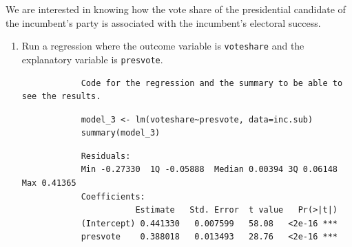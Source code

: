 \documentclass[12pt,letterpaper]{article}
\begin{document}
\noindent We are interested in knowing how the vote share of the presidential candidate of the incumbent's party is associated with the incumbent's electoral success.
	\vspace{.25cm}
	\begin{enumerate}
		\item Run a regression where the outcome variable is \texttt{voteshare} and the explanatory variable is \texttt{presvote}.
		\begin{verbatim}
			Code for the regression and the summary to be able to see the results.
		\end{verbatim}
		\begin{lstlisting}
			model_3 <- lm(voteshare~presvote, data=inc.sub)
			summary(model_3)
		\end{lstlisting}
	   \begin{verbatim} 
			Residuals:    
			Min -0.27330  1Q -0.05888  Median 0.00394 3Q 0.06148  Max 0.41365 
			Coefficients:            
		        	   Estimate   Std. Error  t value   Pr(>|t|)    
			(Intercept) 0.441330   0.007599   58.08   <2e-16 ***
			presvote    0.388018   0.013493   28.76   <2e-16 ***
			

\end{verbatim}
\end{enumerate}
\end{document}
